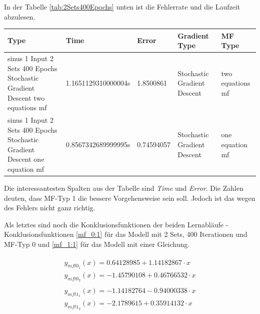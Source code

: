 In der Tabelle \ref{tab:2Sets400Epochs} unten ist die Fehlerrate und die Laufzeit abzulesen.

\begin{center}
	\begin{minipage}{\textwidth}
	\begin{tabular}{ | p{3cm} | l | l | p{3cm} | p{3cm} |}
		\hline
		Type & Time & Error & Gradient Type & MF Type \\ \hline
		sinus 1 Input 2 Sets 400 Epochs Stochastic Gradient Descent two equations mf&1.1651129310000004s&1.8500861&Stochastic Gradient Descent&two equations mf
		 \\ \hline
		sinus 1 Input 2 Sets 400 Epochs Stochastic Gradient Descent one equation mf&0.8567342689999995s&0.74594057&Stochastic Gradient Descent&one equation mf
		 \\ \hline
	\end{tabular}
\label{tab:2Sets400Epochs}
\end{minipage}
\end{center}

Die interessantesten Spalten aus der Tabelle sind \textit{Time} und \textit{Error}. Die Zahlen deuten, dass MF-Typ 1 die bessere Vorgehensweise sein soll. Jedoch ist das wegen des Fehlers nicht ganz richtig.

Als letztes sind noch die Konklusionsfunktionen der beiden Lernabläufe - Konklusionsfunktionen \ref{mf_0:1} für das Modell mit 2 Sets, 400 Iterationen und MF-Typ 0 und \ref{mf_1:1} für das Modell mit einer Gleichung.



\begin{align}
	\begin{split}\label{mf_0:1}
		y_{mft0_1}(x) = 0.64128985 + 1.14182867\cdot x \\
		y_{mft0_2}(x) = -1.45790108 + 0.46766532\cdot x
	\end{split} \\
	\begin{split}\label{mf_1:1}
	y_{mft1_1}(x) = -1.14182764 - 0.94000338\cdot x \\
	y_{mft1_2}(x) = -2.1789615 + 0.35914132\cdot x
	\end{split}	
\end{align}

